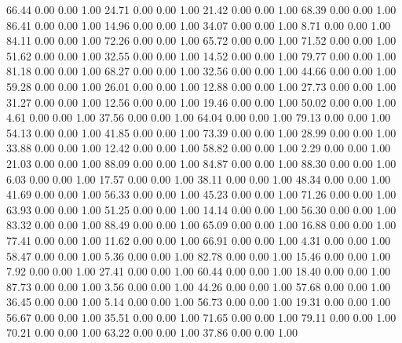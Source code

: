    66.44   0.00   0.00   1.00
   24.71   0.00   0.00   1.00
   21.42   0.00   0.00   1.00
   68.39   0.00   0.00   1.00
   86.41   0.00   0.00   1.00
   14.96   0.00   0.00   1.00
   34.07   0.00   0.00   1.00
    8.71   0.00   0.00   1.00
   84.11   0.00   0.00   1.00
   72.26   0.00   0.00   1.00
   65.72   0.00   0.00   1.00
   71.52   0.00   0.00   1.00
   51.62   0.00   0.00   1.00
   32.55   0.00   0.00   1.00
   14.52   0.00   0.00   1.00
   79.77   0.00   0.00   1.00
   81.18   0.00   0.00   1.00
   68.27   0.00   0.00   1.00
   32.56   0.00   0.00   1.00
   44.66   0.00   0.00   1.00
   59.28   0.00   0.00   1.00
   26.01   0.00   0.00   1.00
   12.88   0.00   0.00   1.00
   27.73   0.00   0.00   1.00
   31.27   0.00   0.00   1.00
   12.56   0.00   0.00   1.00
   19.46   0.00   0.00   1.00
   50.02   0.00   0.00   1.00
    4.61   0.00   0.00   1.00
   37.56   0.00   0.00   1.00
   64.04   0.00   0.00   1.00
   79.13   0.00   0.00   1.00
   54.13   0.00   0.00   1.00
   41.85   0.00   0.00   1.00
   73.39   0.00   0.00   1.00
   28.99   0.00   0.00   1.00
   33.88   0.00   0.00   1.00
   12.42   0.00   0.00   1.00
   58.82   0.00   0.00   1.00
    2.29   0.00   0.00   1.00
   21.03   0.00   0.00   1.00
   88.09   0.00   0.00   1.00
   84.87   0.00   0.00   1.00
   88.30   0.00   0.00   1.00
    6.03   0.00   0.00   1.00
   17.57   0.00   0.00   1.00
   38.11   0.00   0.00   1.00
   48.34   0.00   0.00   1.00
   41.69   0.00   0.00   1.00
   56.33   0.00   0.00   1.00
   45.23   0.00   0.00   1.00
   71.26   0.00   0.00   1.00
   63.93   0.00   0.00   1.00
   51.25   0.00   0.00   1.00
   14.14   0.00   0.00   1.00
   56.30   0.00   0.00   1.00
   83.32   0.00   0.00   1.00
   88.49   0.00   0.00   1.00
   65.09   0.00   0.00   1.00
   16.88   0.00   0.00   1.00
   77.41   0.00   0.00   1.00
   11.62   0.00   0.00   1.00
   66.91   0.00   0.00   1.00
    4.31   0.00   0.00   1.00
   58.47   0.00   0.00   1.00
    5.36   0.00   0.00   1.00
   82.78   0.00   0.00   1.00
   15.46   0.00   0.00   1.00
    7.92   0.00   0.00   1.00
   27.41   0.00   0.00   1.00
   60.44   0.00   0.00   1.00
   18.40   0.00   0.00   1.00
   87.73   0.00   0.00   1.00
    3.56   0.00   0.00   1.00
   44.26   0.00   0.00   1.00
   57.68   0.00   0.00   1.00
   36.45   0.00   0.00   1.00
    5.14   0.00   0.00   1.00
   56.73   0.00   0.00   1.00
   19.31   0.00   0.00   1.00
   56.67   0.00   0.00   1.00
   35.51   0.00   0.00   1.00
   71.65   0.00   0.00   1.00
   79.11   0.00   0.00   1.00
   70.21   0.00   0.00   1.00
   63.22   0.00   0.00   1.00
   37.86   0.00   0.00   1.00
